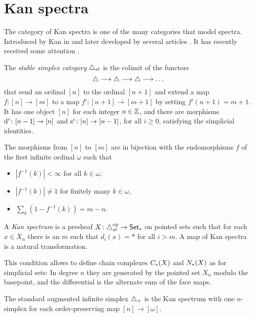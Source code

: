 
\section{Kan spectra}\label{s:9Kanspectra}

The category of Kan spectra is one of the many categories that model spectra. Introduced by Kan in \cite{Kan1963} and later developed by several articles \cite{burghelea_kanspectraI1967, burghelea_kanspectraII_1968, burghelea_kanspectraIII1969,Brown1973}. It has recently received some attention \cite{Stephan2015, CKP2023}.

\begin{definition}
    The \emph{stable simplex category} $\triangle_{st}$ is the colimit of the functors
    \[
        \triangle\longrightarrow \triangle\longrightarrow \triangle\longrightarrow \ldots
    \]
    that send an ordinal $[n]$ to the ordinal $[n+1]$ and extend a map $f \colon  [n]\to [m]$ to a map $f' \colon  [n+1]\to [m+1]$ by setting $f'(n+1) = m+1$. It has one object $[n]$ for each integer $n\in \mathbb{Z}$, and there are morphisms $\operatorname{d}^i \colon  [n-1]\to [n]$ and $\operatorname{s}^i \colon  [n]\to [n-1]$, for all $i\geq 0$, satisfying the simplicial identities.
\end{definition}
The morphisms from $[n]$ to $[m]$ are in bijection with the endomorphisms $f$ of the first infinite ordinal $\omega$ such that
\begin{itemize}
	\item $|f^{-1}(k)|<\infty$ for all $k\in \omega$,
	\item $|f^{-1}(k)|\neq 1$ for finitely many $k\in \omega$,
	\item $\sum_k (1-f^{-1}(k)) = m-n$.
\end{itemize}
\begin{definition}
    A \emph{Kan spectrum} is a presheaf $X \colon  \triangle_{st}^{{\mathrm{op}}}\to \mathsf{Set}_*$ on pointed sets such that for each $x\in X_n$ there is an $m$ such that $d_i(x) = *$ for all $i>m$. A map of Kan spectra is a natural transformation.
\end{definition}

This condition allows to define chain complexes $C_{*}(X)$ and $N_{*}(X)$ as for simplicial sets: In degree $n$ they are generated by the pointed set $X_n$ modulo the basepoint, and the differential is the alternate sum of the face maps.

The standard augmented infinite simplex $\triangle_{+}$ is the Kan spectrum with one $n$-simplex for each order-preserving map $[n]\to [\omega]$.


